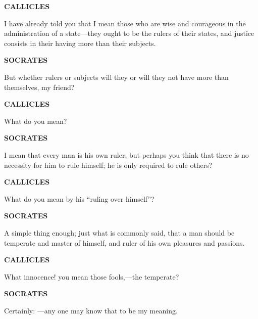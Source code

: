 \documentclass[11pt,letter]{article}
\begin{document}
\par \textbf{CALLICLES}
\par   I have already told you that I mean those who are wise and courageous in the administration of a state—they ought to be the rulers of their states, and justice consists in their having more than their subjects.

\par \textbf{SOCRATES}
\par   But whether rulers or subjects will they or will they not have more than themselves, my friend?

\par \textbf{CALLICLES}
\par   What do you mean?

\par \textbf{SOCRATES}
\par   I mean that every man is his own ruler; but perhaps you think that there is no necessity for him to rule himself; he is only required to rule others?

\par \textbf{CALLICLES}
\par   What do you mean by his “ruling over himself”?

\par \textbf{SOCRATES}
\par   A simple thing enough; just what is commonly said, that a man should be temperate and master of himself, and ruler of his own pleasures and passions.

\par \textbf{CALLICLES}
\par   What innocence! you mean those fools,—the temperate?

\par \textbf{SOCRATES}
\par   Certainly: —any one may know that to be my meaning.
\end{document}
